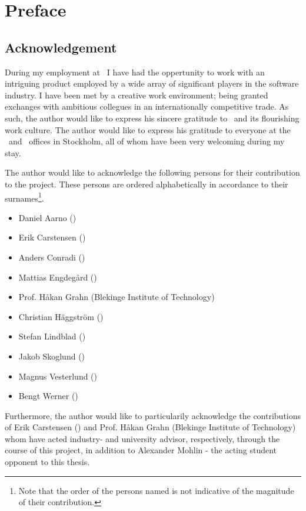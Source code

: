 
\chapter*{Preface}
\label{cha:preface}

\section*{Acknowledgement}
\label{sec:preface_acknowledgement}
During my employment at \dvttermintel\ I have had the oppertunity to work with an intriguing product employed by a wide array of significant players in the software industry.
I have been met by a creative work environment; being granted exchanges with ambitious collegues in an internationally competitive trade.
As such, the author would like to express his sincere gratitude to \dvttermintel\ and its flourishing work culture.
The author would like to express his gratitude to everyone at the \dvttermintel\ and \dvttermwindriver\ offices in Stockholm, all of whom have been very welcoming during my stay.

The author would like to acknowledge the following persons for their contribution to the project.
These persons are ordered alphabetically in accordance to their surnames\footnote{Note that the order of the persons named is not indicative of the magnitude of their contribution.}.

\begin{itemize}[noitemsep]
	\item Daniel Aarno (\dvttermintel )
	\item Erik Carstensen (\dvttermintel )
	\item Anders Conradi (\dvttermintel )
	\item Mattias Engdegård (\dvttermintel )
	\item Prof. Håkan Grahn (Blekinge Institute of Technology)
	\item Christian Häggström (\dvttermintel )
	\item Stefan Lindblad (\dvttermintel )
	\item Jakob Skoglund (\dvttermwindriver )
	\item Magnus Vesterlund (\dvttermwindriver )
	\item Bengt Werner (\dvttermintel )
\end{itemize}

Furthermore, the author would like to particularily acknowledge the contributions of Erik Carstensen (\dvttermintel ) and Prof. Håkan Grahn (Blekinge Institute of Technology) whom have acted industry- and university advisor, respectively, through the course of this project, in addition to Alexander Mohlin - the acting student opponent to this thesis.

